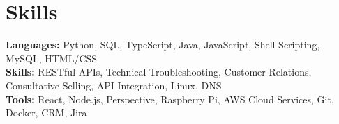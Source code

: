 \documentclass[11pt]{article}       %
\begin{document}

\vspace{-18.5pt}


\section*{Skills}
\textbf{Languages:} Python, SQL, TypeScript, Java, JavaScript, Shell Scripting, MySQL, HTML/CSS\\
\textbf{Skills:} RESTful APIs, Technical Troubleshooting, Customer Relations, Consultative Selling, API Integration, Linux, DNS\\
\textbf{Tools:} React, Node.js, Perspective, Raspberry Pi, AWS Cloud Services, Git, Docker, CRM, Jira\\

\vspace{-6.5pt}
\end{document}
